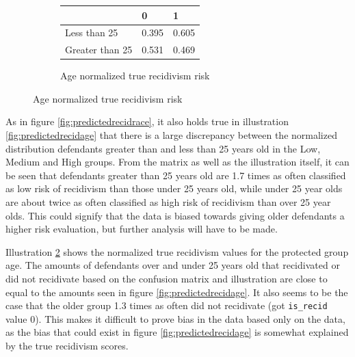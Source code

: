 \documentclass[11pt, fleqn, titlepage]{article}
\begin{document}
\begin{figure}[H]
\begin{subfigure}{0.5\textwidth}
		\begin{table}[H]
			\centering
			\begin{tabular}{|l|l|l|}
				\hline
				& 0   & 1  \\ \hline
				Less than 25      & 0.395 & 0.605  \\ \hline
				Greater than 25   & 0.531 & 0.469  \\ \hline
			\end{tabular}
		\end{table}
		\caption{Age normalized true recidivism risk}		
		\label{fig:age_truerecid}		
	\end{subfigure}
	\end{figure}
	
\noindent As in figure \ref{fig:predictedrecidrace}, it also holds true in illustration \ref{fig:predictedrecidage} that there is a large discrepancy between the normalized distribution defendants greater than and less than 25 years old in the Low, Medium and High groups. From the matrix as well as the illustration itself, it can be seen that defendants greater than 25 years old are 1.7 times as often classified as low risk of recidivism than those under 25 years old, while under 25 year olds are about twice as often classified as high risk of recidivism than over 25 year olds. This could signify that the data is biased towards giving older defendants a higher risk evaluation, but further analysis will have to be made.

Illustration \ref{fig:age_truerecid} shows the normalized true recidivism values for the protected group age. The amounts of defendants over and under 25 years old that recidivated or did not recidivate based on the confusion matrix and illustration are close to equal to the amounts seen in figure \ref{fig:predictedrecidage}. It also seems to be the case that the older group 1.3 times as often did not recidivate (got \texttt{is\_recid} value 0). This makes it difficult to prove bias in the data based only on the data, as the bias that could exist in figure \ref{fig:predictedrecidage} is somewhat explained by the true recidivism scores.
\end{document}
